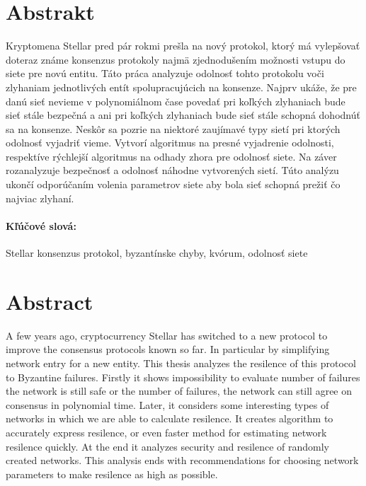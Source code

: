 \documentclass[12pt, twoside]{book}
\begin{document}

\newpage 
\section*{Abstrakt}

Kryptomena Stellar pred pár rokmi prešla na nový protokol, ktorý má vylepšovať
doteraz známe konsenzus protokoly najmä zjednodušením možnosti vstupu do siete
pre novú entitu.
Táto práca analyzuje odolnosť tohto protokolu voči zlyhaniam jednotlivých
entít spolupracujúcich na konsenze. Najprv ukáže, že pre danú sieť nevieme
v polynomiálnom čase povedať pri koľkých zlyhaniach bude sieť stále bezpečná
a ani pri koľkých zlyhaniach bude sieť stále schopná dohodnúť sa na konsenze.
Neskôr sa pozrie na niektoré zaujímavé typy sietí pri ktorých odolnosť vyjadriť
vieme.
Vytvorí algoritmus na presné vyjadrenie odolnosti, respektíve rýchlejší
algoritmus na odhady zhora pre odolnosť siete.
Na záver rozanalyzuje bezpečnosť a odolnosť náhodne vytvorených sietí.
Túto analýzu ukončí odporúčaním volenia parametrov siete aby bola sieť schopná
prežiť čo najviac zlyhaní.

\paragraph*{Kľúčové slová:} Stellar konsenzus protokol, byzantínske chyby,
kvórum, odolnosť siete


\newpage 
\section*{Abstract}

A few years ago, cryptocurrency Stellar has switched to a new protocol
to improve the consensus protocols known so far. In particular by simplifying
network entry for a new entity.
This thesis analyzes the resilence of this protocol to Byzantine failures.
Firstly it shows impossibility to evaluate number of failures the network is
still safe or the number of failures, the network can still agree on consensus in
polynomial time.
Later, it considers some interesting types of networks in which we are able
to calculate resilence.
It creates algorithm to accurately express resilence, or even faster method
for estimating network resilence quickly.
At the end it analyzes security and resilence of randomly created networks.
This analysis ends with recommendations for choosing network parameters to
make resilence as high as possible.
\end{document}
